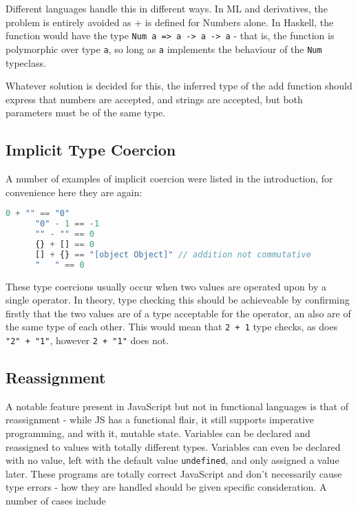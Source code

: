 \documentclass[british, twoside, openright]{bhamthesis}
\theoremstyle{definition}
\begin{document}
    Different languages handle this in different ways. In ML and derivatives, the problem is entirely avoided as + is defined for Numbers alone. In Haskell, the function would have the type \texttt {Num a => a -> a -> a} - that is, the function is polymorphic over type \texttt{a}, so long as \texttt{a} implements the behaviour of the \texttt{Num} typeclass.

    Whatever solution is decided for this, the inferred type of the add function should express that numbers are accepted, and strings are accepted, but both parameters must be of the same type.

  \subsection{Implicit Type Coercion}
    A number of examples of implicit coercion were listed in the introduction, for convenience here they are again:

    \begin{lstlisting}[language=JavaScript]
      0 + "" == "0"
      "0" - 1 == -1
      "" - "" == 0
      {} + [] == 0
      [] + {} == "[object Object]" // addition not commutative
      "   " == 0
    \end{lstlisting}

    These type coercions usually occur when two values are operated upon by a single operator. In theory, type checking this should be achieveable by confirming firstly that the two values are of a type acceptable for the operator, an also are of the same type of each other. This would mean that \texttt{2 + 1} type checks, as does \texttt{"2" + "1"}, however \texttt{2 + "1"} does not.

  \subsection{Reassignment}

    A notable feature present in JavaScript but not in functional languages is that of reassignment - while JS has a functional flair, it still supports imperative programming, and with it, mutable state. Variables can be declared and reassigned to values with totally different types. Variables can even be declared with no value, left with the default value \texttt{undefined}, and only assigned a value later. These programs are totally correct JavaScript and don't necessarily cause type errors - how they are handled should be given specific consideration. A number of cases include
\end{document}
